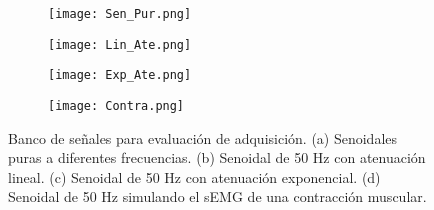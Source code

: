 \begin{figure}[htbp]
	\centering
	\begin{subfigure}[htbp]{0.45\textwidth}
		\texttt{[image: Sen\_Pur.png]}
		\caption{}
		\label{Figura: SenPur}
	\end{subfigure}
	\hfill
	\begin{subfigure}[htbp]{0.45\textwidth}
		\texttt{[image: Lin\_Ate.png]}
		\caption{}
		\label{Figura: LinAte}
	\end{subfigure}
	\hfill
	\begin{subfigure}[htbp]{0.45\textwidth}
		\texttt{[image: Exp\_Ate.png]}
		\caption{}
		\label{Figura: ExpAte}
	\end{subfigure}
	\hfill
	\begin{subfigure}[htbp]{0.45\textwidth}
		\texttt{[image: Contra.png]}
		\caption{}
		\label{Figura: Contra}
	\end{subfigure}	
	\caption[Banco de señales para evaluación de adquisición]{Banco de señales para evaluación de adquisición. (a) Senoidales puras a diferentes frecuencias. (b) Senoidal de 50 Hz con atenuación lineal. (c) Senoidal de 50 Hz con atenuación exponencial. (d) Senoidal de 50 Hz simulando el sEMG de una contracción muscular.}
	\label{Figura: SenalesEva}
\end{figure}

